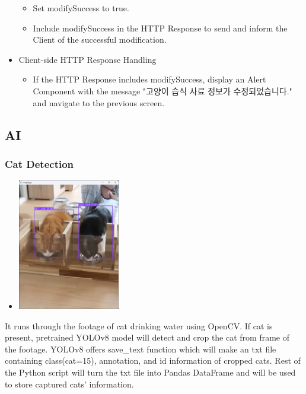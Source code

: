 \documentclass[conference]{IEEEtran}
\begin{document}
\begin{itemize}
\begin{itemize}
\begin{itemize}
\begin{itemize}
            \end{itemize}
        \end{itemize}
        \item Set modifySuccess to true.
        \item Include modifySuccess in the HTTP Response to send and inform the Client of the successful modification.
        \\
    \end{itemize}
    \item Client-side HTTP Response Handling
    \begin{itemize}
        \item If the HTTP Response includes modifySuccess, display an Alert Component with the message "고양이 습식 사료 정보가 수정되었습니다." and navigate to the previous screen.
        \\
    \end{itemize}
\end{itemize}

\subsection{AI}
\subsubsection{Cat Detection}
\begin{itemize}
    \item[] \includegraphics[width=0.35\textwidth]{img/AI/1.png}
\end{itemize}
\begin{itemize}
    \subitem It runs through the footage of cat drinking water using OpenCV. If cat is present, pretrained YOLOv8 model will detect and crop the cat from frame of the footage. YOLOv8 offers save\_text function which will make an txt file containing class(cat=15), annotation, and id information of cropped cats. Rest of the Python script will turn the txt file into Pandas DataFrame and will be used to store captured cats' information. \\
\end{itemize}
\end{document}
